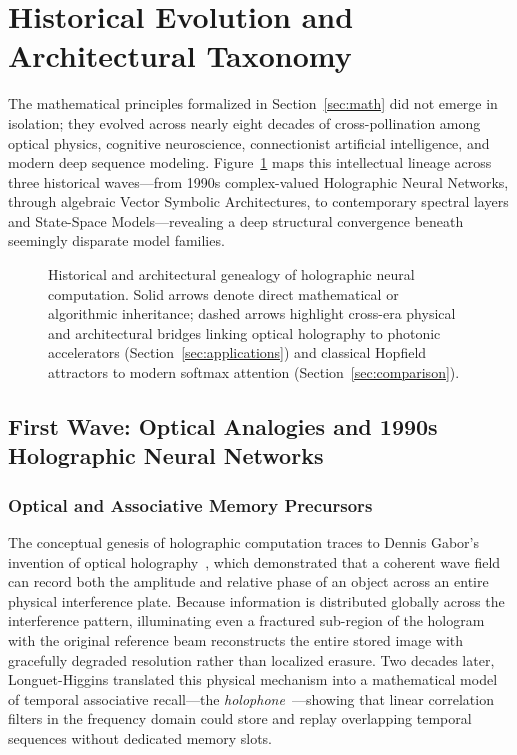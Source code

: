 \section{Historical Evolution and Architectural Taxonomy}\label{sec:history}

The mathematical principles formalized in Section~\ref{sec:math} did not emerge in isolation; they evolved across nearly eight decades of cross-pollination among optical physics, cognitive neuroscience, connectionist artificial intelligence, and modern deep sequence modeling.
Figure~\ref{fig:genealogy} maps this intellectual lineage across three historical waves---from 1990s complex-valued Holographic Neural Networks, through algebraic Vector Symbolic Architectures, to contemporary spectral layers and State-Space Models---revealing a deep structural convergence beneath seemingly disparate model families.

\begin{figure}[tbp]
    \centering
    
    \caption{Historical and architectural genealogy of holographic neural computation. Solid arrows denote direct mathematical or algorithmic inheritance; dashed arrows highlight cross-era physical and architectural bridges linking optical holography to photonic accelerators (Section~\ref{sec:applications}) and classical Hopfield attractors to modern softmax attention (Section~\ref{sec:comparison}).}
    \label{fig:genealogy}
\end{figure}

\subsection{First Wave: Optical Analogies and 1990s Holographic Neural Networks}\label{sec:history:hnn}

\subsubsection{Optical and Associative Memory Precursors}

The conceptual genesis of holographic computation traces to Dennis Gabor's invention of optical holography~\cite{GABOR_1948_HOLOGRAPHY}, which demonstrated that a coherent wave field can record both the amplitude and relative phase of an object across an entire physical interference plate.
Because information is distributed globally across the interference pattern, illuminating even a fractured sub-region of the hologram with the original reference beam reconstructs the entire stored image with gracefully degraded resolution rather than localized erasure.
Two decades later, Longuet-Higgins translated this physical mechanism into a mathematical model of temporal associative recall---the \emph{holophone}~\cite{LONGUET_HIGGINS_1968_HOLOPHONE}---showing that linear correlation filters in the frequency domain could store and replay overlapping temporal sequences without dedicated memory slots.

